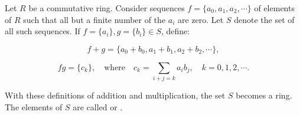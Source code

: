 Let $R$ be a commutative ring. Consider sequences $f = \{a_0, a_1, a_2, \cdots\}$ of elements of $R$ such that all but a finite number of the $a_i$ are zero. Let $S$ denote the set of all such sequences. If $f = \{a_i\}, g = \{b_i\} \in S$, define:

$$f + g = \{a_0 + b_0, a_1 + b_1, a_2 + b_2, \cdots\},$$

$$fg = \{c_k\}, \quad \text{where} \quad c_k = \sum_{i+j=k} a_i b_j, \quad k = 0, 1, 2, \cdots.$$

With these definitions of addition and multiplication, the set $S$ becomes a ring. The elements of $S$ are called  or .
